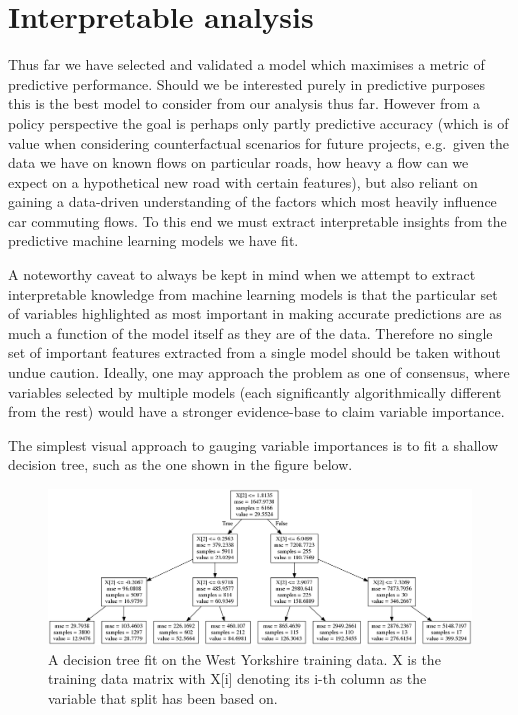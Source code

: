 \documentclass[]{article}
\begin{document}
\section{Interpretable analysis}\label{interpretable-analysis}

Thus far we have selected and validated a model which maximises a metric
of predictive performance. Should we be interested purely in predictive
purposes this is the best model to consider from our analysis thus far.
However from a policy perspective the goal is perhaps only partly
predictive accuracy (which is of value when considering counterfactual
scenarios for future projects, e.g.~given the data we have on known
flows on particular roads, how heavy a flow can we expect on a
hypothetical new road with certain features), but also reliant on
gaining a data-driven understanding of the factors which most heavily
influence car commuting flows. To this end we must extract interpretable
insights from the predictive machine learning models we have fit.

A noteworthy caveat to always be kept in mind when we attempt to extract
interpretable knowledge from machine learning models is that the
particular set of variables highlighted as most important in making
accurate predictions are as much a function of the model itself as they
are of the data. Therefore no single set of important features extracted
from a single model should be taken without undue caution. Ideally, one
may approach the problem as one of consensus, where variables selected
by multiple models (each significantly algorithmically different from
the rest) would have a stronger evidence-base to claim variable
importance.

The simplest visual approach to gauging variable importances is to fit a
shallow decision tree, such as the one shown in the figure below.

\begin{figure}

{\centering \includegraphics[width=0.6\linewidth]{../figures/decision_tree} 

}

\caption{A decision tree fit on the West Yorkshire training data. X is the training data matrix with X[i] denoting its i-th column as the variable that split has been based on.}\label{fig:unnamed-chunk-6}
\end{figure}
\end{document}
